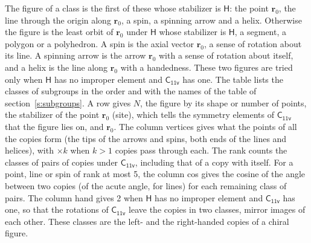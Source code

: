 \documentclass[10pt,a4paper]{article}
\numberwithin{equation}{section}
\newcommand{\grp}[1]{\mathsf{#1}}
\newcommand{\pointr}{\mathbf{r}}
\begin{document}
\leavevmode\label{n:head.figure}The figure of a class is the first of these whose stabilizer is $\grp{H}$: the point $\pointr_0$, the line through the origin along $\pointr_0$, a spin, a spinning arrow and a helix. Otherwise the figure is the least orbit of $\pointr_0$ under $\grp{H}$ whose stabilizer is $\grp{H}$, a segment, a polygon or a polyhedron. A spin is the axial vector $\pointr_0$, a sense of rotation about its line. A spinning arrow is the arrow $\pointr_0$ with a sense of rotation about itself, and a helix is the line along $\pointr_0$ with a handedness. These two figures are tried only when $\grp{H}$ has no improper element and $\grp{C_{11v}}$ has one. The table lists the classes of subgroups in the order and with the names of the table of section~\ref{s:subgroups}. \label{n:head.site}A row gives $N$, the figure by its shape or number of points, the stabilizer of the point $\pointr_0$ (site), which tells the symmetry elements of $\grp{C_{11v}}$ that the figure lies on, and $\pointr_0$. \label{n:head.vertices}The column vertices gives what the points of all the copies form (the tips of the arrows and spins, both ends of the lines and helices), with ${\times}k$ when $k > 1$ copies pass through each. \label{n:head.rank}The rank counts the classes of pairs of copies under $\grp{C_{11v}}$, including that of a copy with itself. \label{n:head.cos}For a point, line or spin of rank at most 5, the column cos gives the cosine of the angle between two copies (of the acute angle, for lines) for each remaining class of pairs. \label{n:head.hand}The column hand gives 2 when $\grp{H}$ has no improper element and $\grp{C_{11v}}$ has one, so that the rotations of $\grp{C_{11v}}$ leave the copies in two classes, mirror images of each other. These classes are the left- and the right-handed copies of a chiral figure.
\end{document}
